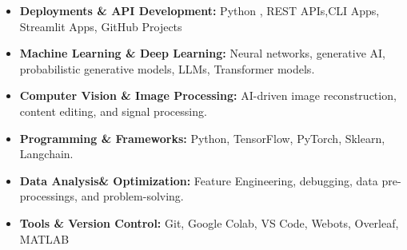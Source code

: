 \documentclass[10 pt, letterpaper]{article}
\begin{document}
\begin{itemize}
    \item \textbf{Deployments \& API Development:} Python , REST APIs,CLI Apps, Streamlit Apps, GitHub Projects
    \vspace{-0.23cm}
    \item \textbf{Machine Learning \& Deep Learning:} Neural networks, generative AI, probabilistic generative models, LLMs, Transformer models.
    \vspace{-0.23cm}
    \item \textbf{Computer Vision \& Image Processing:} AI-driven image reconstruction, content editing, and signal processing.
    \vspace{-0.23cm}
    \item \textbf{Programming \& Frameworks:} Python, TensorFlow, PyTorch, Sklearn, Langchain.
    \vspace{-0.23cm}
    \item \textbf{Data Analysis\& Optimization:} Feature Engineering, debugging, data pre-processings, and problem-solving.
    \item \textbf{Tools \& Version Control:} Git, Google Colab, VS Code, Webots, Overleaf, MATLAB

\end{itemize}
\vspace{-0.1cm}
\end{document}
